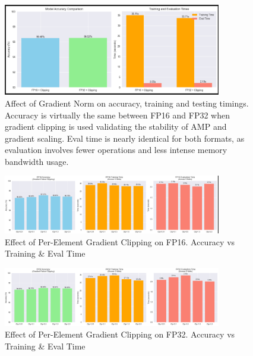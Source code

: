 \documentclass[11pt]{article}
\begin{document}
\begin{figure}[H]
	\centering
	\includegraphics[width=0.85\textwidth]{figures/FP16_32_clipping.png}
	\caption{Affect of Gradient Norm on accuracy, training and testing timings.
                 Accuracy is virtually the same between FP16 and FP32 when gradient clipping is used
		 validating the stability of AMP and gradient scaling.
                 Eval time is nearly identical for both formats, as evaluation involves fewer operations
		 and less intense memory bandwidth usage.}
\end{figure}

\begin{figure}[H]
	\centering
	\includegraphics[width=0.85\textwidth]{figures/gradclip_16.png}
	\caption{Effect of Per-Element Gradient Clipping on FP16.
                 Accuracy vs Training & Eval Time}
        \label{fig:grad16}
\end{figure}

\begin{figure}[H]
	\centering
	\includegraphics[width=0.85\textwidth]{figures/gradclip_32.png}
	\caption{Effect of Per-Element Gradient Clipping on FP32.
                 Accuracy vs Training & Eval Time}
        \label{fig:grad32}
\end{figure}
\end{document}
